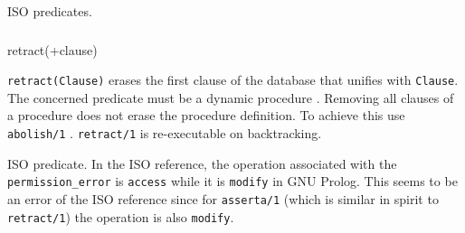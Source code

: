 \begin{PlErrors}





\end{PlErrors}

\Portability

ISO predicates.

\subsubsection{}

\begin{TemplatesOneCol}
retract(+clause)

\end{TemplatesOneCol}

\Description

\texttt{retract(Clause)} erases the first clause of the database
that unifies with \texttt{Clause}. The concerned predicate must be a
dynamic procedure
. Removing all clauses
of a procedure does not erase the procedure definition. To achieve
this use \texttt{abolish/1} . \texttt{retract/1} is
re-executable on backtracking.

\begin{PlErrors}




\end{PlErrors}

\Portability

ISO predicate. In the ISO reference, the operation associated with the
\texttt{permission\_error} is \texttt{access} while it is \texttt{modify} in
GNU Prolog. This seems to be an error of the ISO reference since for
\texttt{asserta/1} (which is similar in spirit to \texttt{retract/1}) the
operation is also \texttt{modify}.

